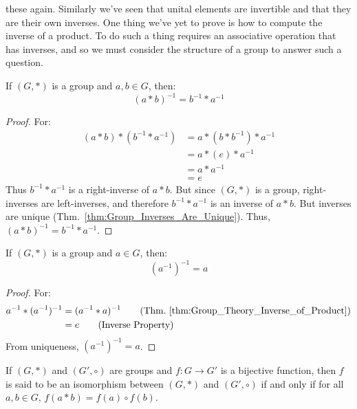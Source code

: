     these again. Similarly we've seen that unital elements are invertible and
    that they are their own inverses. One thing we've yet to prove is how to
    compute the inverse of a product. To do such a thing requires an
    associative operation that has inverses, and so we must consider the
    structure of a group to answer such a question.
    \begin{theorem}
        \label{thm:Group_Inverse_of_Product}%
        If $(G,*)$ is a group and $a,b\in G$, then:
        \begin{equation}
            (a*b)^{\minus{1}}=b^{\minus{1}}*a^{\minus{1}}
        \end{equation}
    \end{theorem}
    \begin{proof}
        For:
        \begin{align}
            (a*b)*(b^{\minus{1}}*a^{\minus{1}})
                &=a*(b*b^{\minus{1}})*a^{\minus{1}}
            \tag{Associativity}\\
            &=a*(e)*a^{-1}
            \tag{Inverse}\\
            &=a*a^{-1}
            \tag{Identity}\\
            &=e
            \tag{Inverse}
        \end{align}
        Thus $b^{-1}*a^{-1}$ is a right-inverse of $a*b$. But since $(G,*)$ is
        a group, right-inverses are left-inverses, and therefore
        $b^{-1}*a^{-1}$ is an inverse of $a*b$. But inverses are unique
        (Thm.~\ref{thm:Group_Inverses_Are_Unique}). Thus,
        $(a*b)^{\minus{1}}=b^{-1}*a^{-1}$.
    \end{proof}
    \begin{theorem}
        If $(G,*)$ is a group and $a\in{G}$, then:
        \begin{equation}
            (a^{-1})^{-1}=a
        \end{equation}
    \end{theorem}
    \begin{proof}
        For:
        \begin{align}
            a^{-1}*(a^{-1})^{-1}
            &=(a^{-1}* a)^{-1}
            \tag{Thm.~\ref{thm:Group_Theory_Inverse_of_Product}}\\
            &=e
            \tag{Inverse Property}
        \end{align}
        From uniqueness, $(a^{-1})^{-1}=a$.
    \end{proof}
    \begin{definition}
        If $(G,*)$ and $(G',\circ)$ are groups and
        $f:G\rightarrow G'$ is a bijective function, then $f$ is said to
        be an isomorphism between $(G,*)$ and $(G',\circ)$ if and only if
        for all $a,b\in{G}$, $f(a*b)=f(a)\circ{f}(b)$.
    \end{definition}
